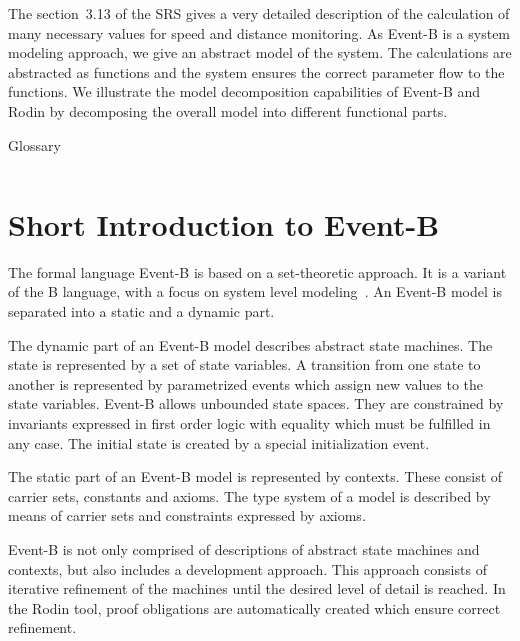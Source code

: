 \documentclass{template/openetcs_article}
\begin{document}
The section~3.13 of the SRS gives a very detailed description of the calculation
of many necessary values for speed and distance monitoring. As Event-B is a
system modeling approach, we give an abstract model of the system. The
calculations are abstracted as functions and the system ensures the correct
parameter flow to the functions. We illustrate the model decomposition
capabilities of Event-B and Rodin by decomposing the overall model into
different functional parts.


\begin{table}[ht]
  \centering
  \begin{tabular}[ht]{|l|l|}
    \hline
     &  \\
    \hline
  \end{tabular}
  \caption{Glossary}
  \label{tab:glossary}
\end{table}

\section{Short Introduction to Event-B}
\label{sec:short-intr-event}

The formal language Event-B is based on a set-theoretic approach. It is a
variant of the B language, with a focus on system level
modeling~\cite{abrial-eventB-Book}. An Event-B model is separated into a static
and a dynamic part.

The dynamic part of an Event-B model describes abstract state machines. The
state is represented by a set of state variables. A transition from one state to
another is represented by parametrized events which assign new values to the
state variables. Event-B allows unbounded state spaces. They are constrained by
invariants expressed in first order logic with equality which must be fulfilled
in any case. The initial state is created by a special initialization event.

The static part of an Event-B model is represented by contexts. These consist of
carrier sets, constants and axioms. The type system of a model is described by
means of carrier sets and constraints expressed by axioms.

Event-B is not only comprised of descriptions of abstract state machines and
contexts, but also includes a development approach. This approach consists of
iterative refinement of the machines until the desired level of detail is
reached. In the Rodin tool, proof obligations are automatically created which
ensure correct refinement.
\end{document}
